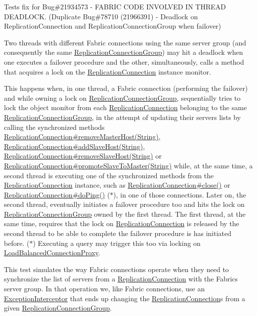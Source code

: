 Tests fix for Bug\#21934573 -\/ F\+A\+B\+R\+IC C\+O\+DE I\+N\+V\+O\+L\+V\+ED IN T\+H\+R\+E\+AD D\+E\+A\+D\+L\+O\+CK. (Duplicate Bug\#78710 (21966391) -\/ Deadlock on Replication\+Connection and Replication\+Connection\+Group when failover)

Two threads with different Fabric connections using the same server group (and consequently the same \mbox{\hyperlink{}{Replication\+Connection\+Group}}) may hit a deadlock when one executes a failover procedure and the other, simultaneously, calls a method that acquires a lock on the \mbox{\hyperlink{}{Replication\+Connection}} instance monitor.

This happens when, in one thread, a Fabric connection (performing the failover) and while owning a lock on \mbox{\hyperlink{}{Replication\+Connection\+Group}}, sequentially tries to lock the object monitor from each \mbox{\hyperlink{}{Replication\+Connection}} belonging to the same \mbox{\hyperlink{}{Replication\+Connection\+Group}}, in the attempt of updating their servers lists by calling the synchronized methods \mbox{\hyperlink{}{Replication\+Connection\#remove\+Master\+Host(\+String)}}, \mbox{\hyperlink{}{Replication\+Connection\#add\+Slave\+Host(\+String)}}, \mbox{\hyperlink{}{Replication\+Connection\#remove\+Slave\+Host(\+String)}} or \mbox{\hyperlink{}{Replication\+Connection\#promote\+Slave\+To\+Master(\+String)}} while, at the same time, a second thread is executing one of the synchronized methods from the \mbox{\hyperlink{}{Replication\+Connection}} instance, such as \mbox{\hyperlink{}{Replication\+Connection\#close()}} or \mbox{\hyperlink{}{Replication\+Connection\#do\+Ping()}} ($\ast$), in one of those connections. Later on, the second thread, eventually initiates a failover procedure too and hits the lock on \mbox{\hyperlink{}{Replication\+Connection\+Group}} owned by the first thread. The first thread, at the same time, requires that the lock on \mbox{\hyperlink{}{Replication\+Connection}} is released by the second thread to be able to complete the failover procedure is has initiated before. ($\ast$) Executing a query may trigger this too via locking on \mbox{\hyperlink{}{Load\+Balanced\+Connection\+Proxy}}.

This test simulates the way Fabric connections operate when they need to synchronize the list of servers from a \mbox{\hyperlink{}{Replication\+Connection}} with the Fabric\textquotesingle{}s server group. In that operation we, like Fabric connections, use an \mbox{\hyperlink{}{Exception\+Interceptor}} that ends up changing the \mbox{\hyperlink{}{Replication\+Connection}}s from a given \mbox{\hyperlink{}{Replication\+Connection\+Group}}.

